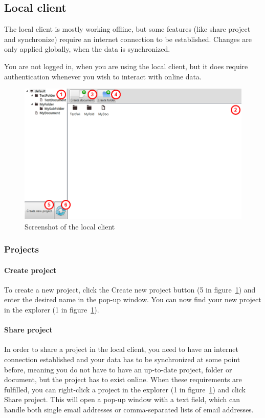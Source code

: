 \subsection{Local client}

The local client is mostly working offline, but some features (like share project and synchronize) require an
internet connection to be established. Changes are only applied globally, when the data is synchronized.

You are not logged in, when you are using the local client, but it does require authentication whenever you wish to interact with online data.

\begin{figure}[htb]
	\centering
	\includegraphics[width=1\textwidth]{User_manual/graphics/local.png}
	\caption{Screenshot of the local client}
	\label{fig:manual-local}
\end{figure}

\subsubsection{Projects}

	\paragraph{Create project}
	To create a new project, click the Create new project button (5 in figure~\ref{fig:manual-local}) and enter the desired name in the pop-up window. You can now find your new project in the explorer (1 in figure~\ref{fig:manual-local}).

	\paragraph{Share project}
	In order to share a project in the local client, you need to have an internet connection established and your data
    has to be synchronized at some point before, meaning you do not have to have an up-to-date project, folder or
    document, but the project has to exist online. When these requirements are fulfilled, you can right-click a project
    in the explorer (1 in figure~\ref{fig:manual-local}) and click Share project. This will open a pop-up window with
    a text field, which can handle both single email addresses or comma-separated lists of email addresses.

